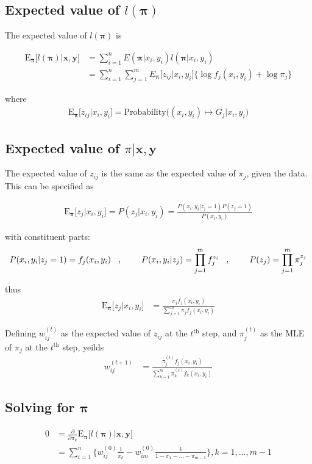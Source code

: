 \documentclass[12pt]{amsart}
\newcommand{\vect}[1]{\boldsymbol{\mathbf{#1}}}
\newcommand{\eqn}[1]{\begin{align*}
#1
\end{align*}}
\newcommand{\shblock}{\hspace{3mm}}
\newcommand{\hblock}{\hspace{8mm}}
\newcommand{\eqnsep}{\shblock,\hblock}
\newcommand{\bl}{\big\{}
\newcommand{\br}{\big\}}
\newcommand{\Bl}{\Big\{}
\newcommand{\Br}{\Big\}}
\newcommand{\vx}{\vect{x}}
\newcommand{\vy}{\vect{y}}
\newcommand{\vp}{\vect{\pi}}
\newcommand{\fab}{f_j}
\newcommand{\llp}{l(\vect{\pi})}
\newcommand{\sumn}{\sum^n_{i=1}}
\newcommand{\summ}{\sum^m_{j=1}}
\newcommand{\sumk}{\sum^m_{k=1}}
\begin{document}
\subsection{Expected value of $\llp$}
The expected value of  $\llp$ is

\eqn{
	\text{E}_{\vp}\Big[\llp \big| \vx,\vy \Big] &= \sumn E(\vp | x_i, y_i) l(\vp | x_i, y_i) 		\\
	&= \sumn \summ E_{\vp}\big[z_{ij}|x_i,y_i\big] \bl \log \fab(x_i,y_i) + \log \pi_j  \br
}

where
\eqn{
	\text{E}_{\vp}\Big[  z_{ij} | x_i, y_i \Big] = \text{Probability}\Big((x_i,y_i) \mapsto G_j \big | x_i,y_i\Big)
}








\subsection{Expected value of $\pi|\vect{x},\vect{y}$}
The expected value of $z_{ij}$ is the same as the expected value of $\pi_j$, given the data. This can be specified as

\eqn{
	\text{E}_{\vp}\Big[ z_{j} | x_i,y_i \Big] = P(z_j|x_i,y_i) = \frac{P(x_i,y_i|z_j=1)P(z_j=1)}{P(x_i,y_i)}
}

with constituent parts:
\eqn{
	P(x_i,y_i | z_j=1) = f_j(x_i,y_i) \eqnsep  P(x_i,y_i|z_j) = \prod^m_{j=1}f_j^{z_i}	 \eqnsep  P(z_j) = \prod^m_{j=1} \pi_j^{z_j}
}

thus
\eqn{
	\text{E}_{\vp}\Big[ z_{j} | x_i,y_i \Big] &=  \frac{\pi_j \fab(x_i,y_i)}{\summ \pi_j \fab(x_i,y_i)}
}


Defining $w^{(t)}_{ij}$ as the expected value of $z_{ij}$ at the $t^\text{th}$ step, and $\pi^{(t)}_j$ as the MLE of $\pi_j$  at the $t^\text{th}$ step, yeilds
\eqn{
	w^{(t+1)}_{ij} &= \frac{\pi^{(t)}_{j} \fab(x_i,y_i)}{\sumk \pi^{(t)}_{k}f_k(x_i,y_i)}
}







\subsection{Solving for $\vp$}
\eqn{
	0 &= \frac{\partial}{\partial \pi_k} \text{E}_{\vect{\pi}}\Big[\llp \big| \vect{x},\vect{y}\Big]    \\
	& =      \sumn \Bl  w^{(0)}_{ij} \frac{1}{\pi_k} - w^{(0)}_{im} \frac{1}{1-\pi_1-\ldots-\pi_{m-1}}   \Br, k=1,\ldots,m-1
}
\end{document}
